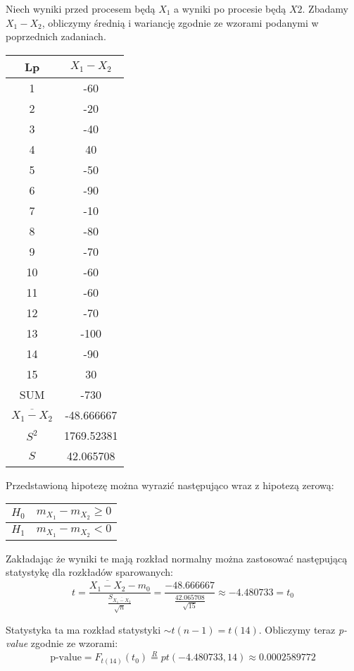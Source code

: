 \documentclass{article}
\begin{document}
Niech wyniki przed procesem będą $X_1$ a wyniki po procesie będą $X2$. Zbadamy $X_1-X_2$, obliczymy średnią i wariancję zgodnie ze wzorami podanymi w poprzednich zadaniach.
\begin{center} \begin{tabular}{|c|c|} \hline
Lp & $X_1-X_2$ \\ \hline
1 & -60 \\ \hline
2 & -20 \\ \hline
3 & -40 \\ \hline
4 & 40 \\ \hline
5 & -50 \\ \hline
6 & -90 \\ \hline
7 & -10 \\ \hline
8 & -80 \\ \hline
9 & -70 \\ \hline
10 & -60 \\ \hline
11  & -60 \\ \hline
12 & -70 \\ \hline
13 & -100 \\ \hline
14 & -90 \\ \hline
15 & 30 \\ \hline
SUM & -730 \\ \hline
$\overline{X_1-X_2}$ & -48.666667 \\ \hline
$S^2$ & 1769.52381\\ \hline
$S$ & 42.065708 \\ \hline
\end{tabular} \end{center}

Przedstawioną hipotezę można wyrazić następująco wraz z hipotezą zerową:
\begin{center} \begin{tabular}{|c|c|} \hline
$H_0$ & $m_{X_1} - m_{X_2} \geq 0$ \\ \hline
$H_1$ & $m_{X_1} - m_{X_2} < 0$ \\ \hline
\end{tabular} \end{center}

Zakładając że wyniki te mają rozkład normalny można zastosować następującą statystykę dla rozkładów sparowanych:
\[ t = \frac{\overline{X_1-X_2} - m_0}{ \frac{S_{\overline{X_1-X_2}} }{\sqrt{n} } } = \frac{-48.666667}{ \frac{42.065708}{\sqrt{15}} } \approx -4.480733 = t_0\]

Statystyka ta ma rozkład statystyki $\sim t(n-1) = t(14)$. Obliczymy teraz \textit{p-value} zgodnie ze wzorami:
\[ \text{p-value} = F_{t(14)}(t_0) \overset{R}{=} pt(-4.480733, 14) \approx 0.0002589772 \]
\end{document}
